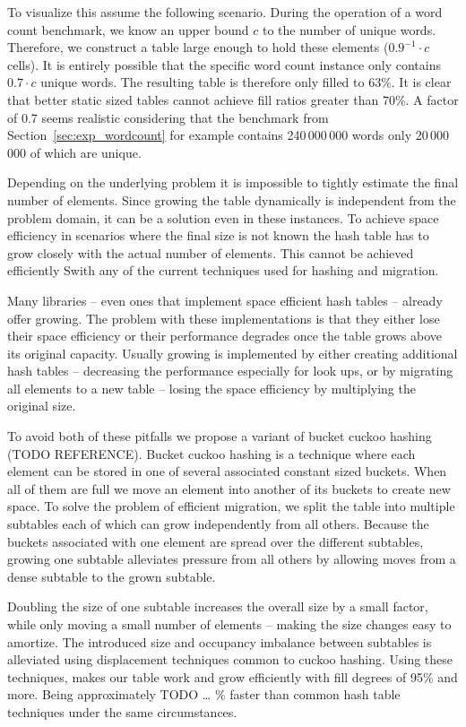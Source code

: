 \documentclass[a4paper,UKenglish]{lipics-v2016}
\begin{document}
To visualize this assume the following scenario.  During the operation
of a word count benchmark, we know an upper bound $c$ to the number of
unique words. Therefore, we construct a table large enough to hold
these elements ($0.9^{-1}\cdot c$ cells).  It is entirely possible
that the specific word count instance only contains $0.7\cdot c$
unique words.  The resulting table is therefore only filled to 63\%.
It is clear that better static sized tables cannot achieve fill ratios
greater than 70\%.  A factor of 0.7 seems realistic considering
that the benchmark from Section~\ref{sec:exp_wordcount} for example
contains 240\,000\,000 words only 20\,000\,000 of which are unique.

Depending on the underlying problem it is impossible to tightly
estimate the final number of elements. Since growing the table
dynamically is independent from the problem domain, it can be a
solution even in these instances.  To achieve space efficiency in
scenarios where the final size is not known the hash table has to grow
closely with the actual number of elements.  This cannot be achieved
efficiently Swith any of the current techniques used for hashing and
migration.

Many libraries -- even ones that implement space efficient hash tables
-- already offer growing.  The problem with these implementations is
that they either lose their space efficiency or their performance
degrades once the table grows above its original capacity.  Usually
growing is implemented by either creating additional hash tables --
decreasing the performance especially for look ups, or by migrating
all elements to a new table -- losing the space efficiency by
multiplying the original size.

To avoid both of these pitfalls we propose a variant of bucket cuckoo
hashing (TODO REFERENCE).  Bucket cuckoo hashing is a technique where
each element can be stored in one of several associated constant sized
buckets.  When all of them are full we move an element into another of
its buckets to create new space.  To solve the problem of efficient
migration, we split the table into multiple subtables each of which
can grow independently from all others.  Because the buckets
associated with one element are spread over the different subtables,
growing one subtable alleviates pressure from all others by allowing
moves from a dense subtable to the grown subtable.

Doubling the size of one subtable increases the overall size by a
small factor, while only moving a small number of elements -- making
the size changes easy to amortize. The introduced size and occupancy
imbalance between subtables is alleviated using displacement
techniques common to cuckoo hashing. Using these techniques, makes our
table work and grow efficiently with fill degrees of 95\% and more.
Being approximately TODO \ldots{} \% faster than common hash table
techniques under the same circumstances.
\end{document}
